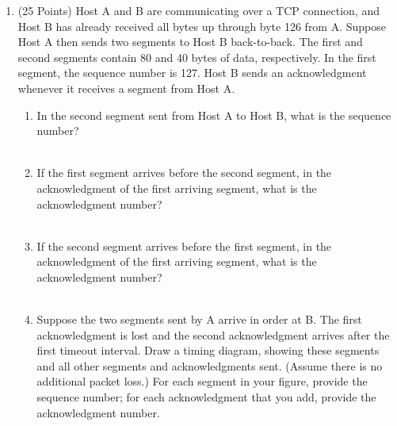 \documentclass[11pt]{article}
\begin{document}
\begin{enumerate}
    \item (25 Points) Host A and B are communicating over a TCP connection, and Host B has
    already received all bytes up through byte 126 from A. Suppose Host A then sends two
    segments to Host B back-to-back. The first and second segments contain 80 and 40 bytes
    of data, respectively. In the first segment, the sequence number is 127. Host B sends an
    acknowledgment whenever it receives a segment from Host A.
        \begin{enumerate}[label=(\alph*)]
            \item In the second segment sent from Host A to Host B, what is the sequence number? \\\\ \answerFourPartOne
            \item If the first segment arrives before the second segment, in the acknowledgment of the first
            arriving segment, what is the acknowledgment number? \\\\ \answerFourPartTwo
            \item If the second segment arrives before the first segment, in the acknowledgment of the first
            arriving segment, what is the acknowledgment number? \\\\ \answerFourPartThree
            \item Suppose the two segments sent by A arrive in order at B. The first acknowledgment is lost
            and the second acknowledgment arrives after the first timeout interval. Draw a timing
            diagram, showing these segments and all other segments and acknowledgments sent.
            (Assume there is no additional packet loss.) For each segment in your figure, provide the
            sequence number; for each acknowledgment that you add, provide the acknowledgment
            number. \\\\ \answerFourPartFour
        \end{enumerate}
\end{enumerate}
\end{document}

